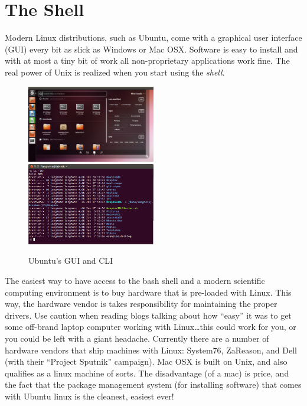\section{The Shell}
Modern Linux distributions, such as Ubuntu, come with a graphical user interface (GUI) every bit as slick as Windows or Mac OSX.  Software is easy to install and with at most a tiny bit of work all non-proprietary applications work fine.  The real power of Unix is realized when you start using the \emph{shell}.
\begin{figure}
  \label{unix:fig:ubuntu}
  \includegraphics[width=0.5\textwidth]{../images/ubuntugui}
  \includegraphics[width=0.5\textwidth]{../images/terminal}
  \caption{Ubuntu's GUI and CLI}
\end{figure}

\begin{digression}
  The easiest way to have access to the bash shell and a modern scientific computing environment is to buy hardware that is pre-loaded with Linux.  This way, the hardware vendor is takes responsibility for maintaining the proper drivers.  Use caution when reading blogs talking about how ``easy'' it was to get some off-brand laptop computer working with Linux\ldots this could work for you, or you could be left with a giant headache.  Currently there are a number of hardware vendors that ship machines with Linux:  System76, ZaReason, and Dell (with their ``Project Sputnik'' campaign).  Mac OSX is built on Unix, and also qualifies as a linux machine of sorts.  The disadvantage (of a mac) is price, and the fact that the package management system (for installing software) that comes with Ubuntu linux is the cleanest, easiest ever!
\end{digression}


